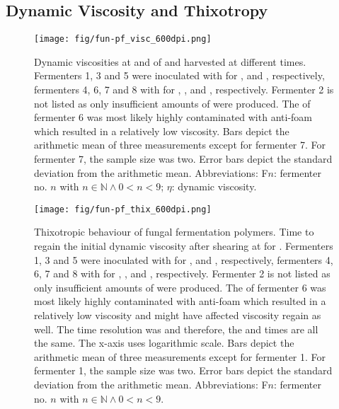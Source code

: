 \subsection{Dynamic Viscosity and Thixotropy}
\begin{figure}
	\begin{center}
		\texttt{[image: fig/fun-pf\_visc\_600dpi.png]}
		\caption[Dynamic Viscosities of Fungal Fermentation Polymers]{Dynamic viscosities at  and  of \scl{} and \shz{} harvested at different times. Fermenters 1, 3 and 5 were inoculated with \rolf{} for ,  and , respectively, fermenters 4, 6, 7 and 8 with \comm{} for , ,  and , respectively. Fermenter 2 is not listed as only insufficient amounts of \eps{} were produced. The \eps{} of fermenter 6 was most likely highly contaminated with anti-foam which resulted in a relatively low viscosity. Bars depict the arithmetic mean of three measurements except for fermenter 7. For fermenter 7, the sample size was two. Error bars depict the standard deviation from the arithmetic mean. Abbreviations: F$n$: fermenter no. $n$ with $n \in \mathbb{N} \land 0 < n < 9$; $\eta$: dynamic viscosity.\label{fig-fun-pf-visc}}
	\end{center}
\end{figure}
\begin{figure}
	\begin{center}
		\texttt{[image: fig/fun-pf\_thix\_600dpi.png]}
		\caption[Thixotropic Behaviour of Fungal Fermentation Polymers]{Thixotropic behaviour of fungal fermentation polymers. Time to regain the initial dynamic viscosity after shearing at  for . Fermenters 1, 3 and 5 were inoculated with \rolf{} for ,  and , respectively, fermenters 4, 6, 7 and 8 with \comm{} for , ,  and , respectively. Fermenter 2 is not listed as only insufficient amounts of \eps{} were produced. The \eps{} of fermenter 6 was most likely highly contaminated with anti-foam which resulted in a relatively low viscosity and might have affected viscosity regain as well. The time resolution was  and therefore, the  and  times are all the same. The x-axis uses logarithmic scale. Bars depict the arithmetic mean of three measurements except for fermenter 1. For fermenter 1, the sample size was two. Error bars depict the standard deviation from the arithmetic mean. Abbreviations: F$n$: fermenter no. $n$ with $n \in \mathbb{N} \land 0 < n < 9$.\label{fig-fun-pf-thix}}
	\end{center}
\end{figure}

